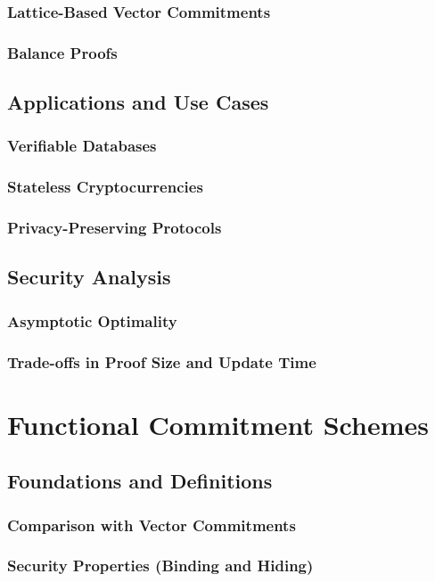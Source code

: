 \documentclass{iacrtrans}
\begin{document}
\subsubsection{Lattice-Based Vector Commitments}
\subsubsection{Balance Proofs}
\subsection{Applications and Use Cases}
\subsubsection{Verifiable Databases}
\subsubsection{Stateless Cryptocurrencies}
\subsubsection{Privacy-Preserving Protocols}
\subsection{Security Analysis}
\subsubsection{Asymptotic Optimality}
\subsubsection{Trade-offs in Proof Size and Update Time}

\section{Functional Commitment Schemes}
\subsection{Foundations and Definitions}
\subsubsection{Comparison with Vector Commitments}
\subsubsection{Security Properties (Binding and Hiding)}
\end{document}
